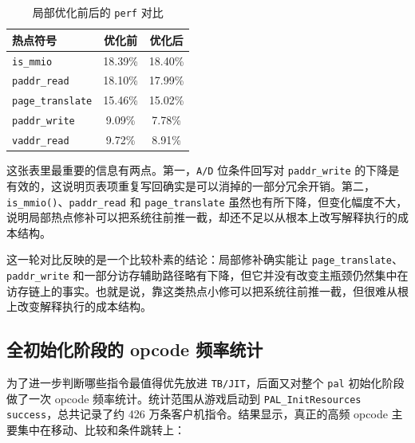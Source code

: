 \documentclass[a4paper]{article}
\begin{document}
\begin{table}[H]
  \centering
  \begin{tabular}{lcc}
    \toprule
    热点符号 & 优化前 & 优化后 \\
    \midrule
    \texttt{is\_mmio} & 18.39\% & 18.40\% \\
    \texttt{paddr\_read} & 18.10\% & 17.99\% \\
    \texttt{page\_translate} & 15.46\% & 15.02\% \\
    \texttt{paddr\_write} & 9.09\% & 7.78\% \\
    \texttt{vaddr\_read} & 9.72\% & 8.91\% \\
    \bottomrule
  \end{tabular}
  \caption{局部优化前后的 \texttt{perf} 对比}
\end{table}

这张表里最重要的信息有两点。第一，\texttt{A/D} 位条件回写对 \texttt{paddr\_write} 的下降是有效的，这说明页表项重复写回确实是可以消掉的一部分冗余开销。第二，\texttt{is\_mmio()}、\texttt{paddr\_read} 和 \texttt{page\_translate} 虽然也有所下降，但变化幅度不大，说明局部热点修补可以把系统往前推一截，却还不足以从根本上改写解释执行的成本结构。

这一轮对比反映的是一个比较朴素的结论：局部修补确实能让 \texttt{page\_translate}、\texttt{paddr\_write} 和一部分访存辅助路径略有下降，但它并没有改变主瓶颈仍然集中在访存链上的事实。也就是说，靠这类热点小修可以把系统往前推一截，但很难从根上改变解释执行的成本结构。

\subsection{全初始化阶段的 opcode 频率统计}
为了进一步判断哪些指令最值得优先放进 \texttt{TB/JIT}，后面又对整个 \texttt{pal} 初始化阶段做了一次 opcode 频率统计。统计范围从游戏启动到 \texttt{PAL\_InitResources success}，总共记录了约 426 万条客户机指令。结果显示，真正的高频 opcode 主要集中在移动、比较和条件跳转上：
\end{document}
